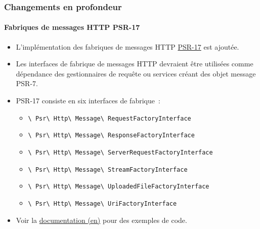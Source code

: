 
\begin{frame}[fragile]
	\frametitle{Changements en profondeur}
	\framesubtitle{Fabriques de messages HTTP PSR-17}

	\begin{itemize}
		\item L'implémentation des fabriques de messages HTTP
			\href{https://www.php-fig.org/psr/psr-17/}{PSR-17} est ajoutée.
		\item Les interfaces de fabrique de messages HTTP devraient être
			utilisées comme dépendance des gestionnaires de requête ou services
			créant des objet message PSR-7.
		\item PSR-17 consiste en six interfaces de fabrique~:

			\begin{itemize}\smaller
				\item \texttt{\textbackslash
					Psr\textbackslash
					Http\textbackslash
					Message\textbackslash
					RequestFactoryInterface}
				\item \texttt{\textbackslash
					Psr\textbackslash
					Http\textbackslash
					Message\textbackslash
					ResponseFactoryInterface}
				\item \texttt{\textbackslash
					Psr\textbackslash
					Http\textbackslash
					Message\textbackslash
					ServerRequestFactoryInterface}
				\item \texttt{\textbackslash
					Psr\textbackslash
					Http\textbackslash
					Message\textbackslash
					StreamFactoryInterface}
				\item \texttt{\textbackslash
					Psr\textbackslash
					Http\textbackslash
					Message\textbackslash
					UploadedFileFactoryInterface}
				\item \texttt{\textbackslash
					Psr\textbackslash
					Http\textbackslash
					Message\textbackslash
					UriFactoryInterface}

			\end{itemize}\normalsize

		\item Voir la
			\href{https://docs.typo3.org/c/typo3/cms-core/master/en-us/Changelog/10.1/Feature-89018-ProvideImplementationForPSR-17HTTPMessageFactories.html}{documentation (en)}
			pour des exemples de code.

	\end{itemize}

\end{frame}

